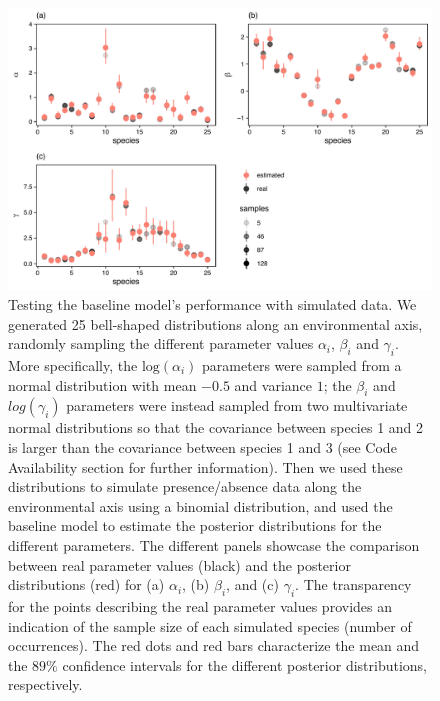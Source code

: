 \documentclass[11pt, a4paper]{article}
\begin{document}
\clearpage


\begin{figure}[ht]
  \centering
    \vspace{0.5cm}
    \includegraphics[width=1\textwidth]{figures/simulations-comparison}
    	  \vspace{0.3cm}
	   \caption{Testing the baseline model's performance with simulated data. We generated 25 bell-shaped distributions along an environmental axis, randomly sampling the different parameter values $\alpha_i$, $\beta_i$ and $\gamma_i$. More specifically, the $\text{log}\left(\alpha_i\right)$ parameters were sampled from a normal distribution with mean $-0.5$ and variance $1$; the $\beta_i$ and $log(\gamma_i)$ parameters were instead sampled from two multivariate normal distributions so that the covariance between species 1 and 2 is larger than the covariance between species 1 and 3 (see Code Availability section for further information). Then we used these distributions to simulate presence/absence data along the environmental axis using a binomial distribution, and used the baseline model to estimate the posterior distributions for the different parameters. The different panels showcase the comparison between real parameter values (black) and the posterior distributions (red) for (a) $\alpha_i$, (b) $\beta_i$, and (c) $\gamma_i$. The transparency for the points describing the real parameter values provides an indication of the sample size of each simulated species (number of occurrences). The red dots and red bars characterize the mean and the $89\%$ confidence intervals for the different posterior distributions, respectively.}
      \label{sfig:simulations}
\end{figure}
\end{document}
